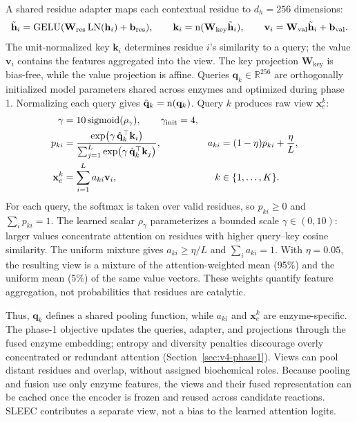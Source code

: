 A shared residue adapter maps each contextual residue to $d_h=256$ dimensions:
\begin{equation}
  \tilde{\mathbf{h}}_i=\operatorname{GELU}(\mathbf{W}_{\mathrm{res}}\operatorname{LN}(\mathbf{h}_i)+\mathbf{b}_{\mathrm{res}}),\qquad
  \mathbf{k}_i=\operatorname{n}(\mathbf{W}_{\mathrm{key}}\tilde{\mathbf{h}}_i),\qquad
  \mathbf{v}_i=\mathbf{W}_{\mathrm{val}}\tilde{\mathbf{h}}_i+\mathbf{b}_{\mathrm{val}}.
  \label{eq:v4-residue-adapter}
\end{equation}
The unit-normalized key $\mathbf{k}_i$ determines residue $i$'s similarity to a query;
the value $\mathbf{v}_i$ contains the features aggregated into the view. The key
projection $\mathbf{W}_{\mathrm{key}}$ is bias-free, while the value projection is affine.
Queries $\mathbf{q}_k\in\mathbb{R}^{256}$ are orthogonally initialized model parameters
shared across enzymes and optimized during phase 1. Normalizing each query
gives $\hat{\mathbf{q}}_k=\operatorname{n}(\mathbf{q}_k)$. Query $k$ produces raw view
$\mathbf{x}_e^{k}$:
\begin{align}
  \gamma &=10\operatorname{sigmoid}(\rho_\gamma),\qquad \gamma_{\mathrm{init}}=4,\\
  p_{ki}&=\frac{\exp\!\left(\gamma\,\hat{\mathbf{q}}_k^{\top}\mathbf{k}_i\right)}
                     {\sum_{j=1}^{L}\exp\!\left(\gamma\,\hat{\mathbf{q}}_k^{\top}\mathbf{k}_j\right)},
  & a_{ki}&=(1-\eta)p_{ki}+\frac{\eta}{L},\\
  \mathbf{x}_e^{k}&=\sum_{i=1}^{L}a_{ki}\mathbf{v}_i,
  & k&\in\{1,\ldots,K\}.
  \label{eq:v4-slots}
\end{align}
For each query, the softmax is taken over valid residues, so $p_{ki}\geq0$
and $\sum_i p_{ki}=1$. The learned scalar $\rho_\gamma$ parameterizes a
bounded scale $\gamma\in(0,10)$: larger values concentrate attention on
residues with higher query--key cosine similarity. The uniform mixture gives
$a_{ki}\geq\eta/L$ and $\sum_i a_{ki}=1$. With $\eta=0.05$, the resulting
view is a mixture of the attention-weighted mean (95\%) and the uniform
mean (5\%) of the same value vectors. These weights quantify feature
aggregation, not probabilities that residues are catalytic.

Thus, $\mathbf{q}_k$ defines a shared pooling function, while $a_{ki}$ and
$\mathbf{x}_e^{k}$ are enzyme-specific. The phase-1 objective updates the queries,
adapter, and projections through the fused enzyme embedding; entropy and
diversity penalties discourage overly concentrated or redundant attention
(Section~\ref{sec:v4-phase1}). Views can pool distant residues and overlap,
without assigned biochemical roles. Because pooling and fusion use only
enzyme features, the views and their fused representation can be cached
once the encoder is frozen and reused across candidate reactions.
SLEEC contributes a separate view, not a bias to the learned attention logits.

